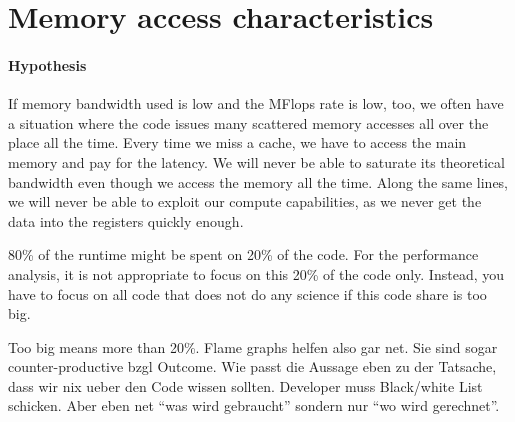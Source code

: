 \section{Memory access characteristics}
\label{section:core:memory-access-characteristics}


\paragraph{Hypothesis}

If memory bandwidth used is low and the MFlops rate is low, too, we often have a
situation where the code issues many scattered memory accesses all over the
place all the time.
Every time we miss a cache, we have to access the main memory and pay for the
latency. 
We will never be able to saturate its theoretical bandwidth even though we
access the memory all the time.
Along the same lines, we will never be able to exploit our compute capabilities,
as we never get the data into the registers quickly enough.



\begin{assessmentcrime}
 80\% of the runtime might be spent on 20\% of the code.
 For the performance analysis, it is not appropriate to focus on this 20\% of
 the code only.
 Instead, you have to focus on all code that does not do any science if this
 code share is too big.
\end{assessmentcrime}

Too big means more than 20\%. Flame graphs helfen also gar net. Sie sind sogar
counter-productive bzgl Outcome. 
Wie passt die Aussage eben zu der Tatsache, dass wir nix ueber den Code wissen
sollten.
Developer muss Black/white List schicken.  Aber eben net ``was wird gebraucht''
sondern nur ``wo wird gerechnet''.



